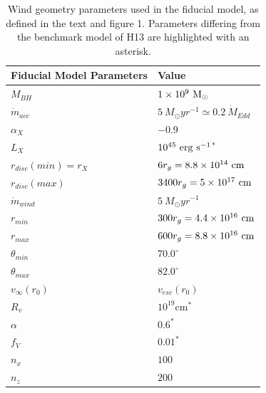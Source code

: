 \documentclass[useAMS,usenatbib]{mn2e_x}
\begin{document}
\begin{table}
\begin{tabular}{p{3cm}p{4cm}}
\hline Fiducial Model Parameters 	&	 Value \\ 
\hline \hline 
$M_{BH}$ 	 &	 $1\times 10^9~\rm{M_{\odot}}$ \\ 
$\dot{m}_{acc}$ 	 &	 $5~M_{\odot}yr^{-1} \simeq 0.2~\dot{M}_{Edd}$\\ 
$\alpha_X$ 	 &	 $-0.9$ \\ 
$L_{X} $ 	 &	 $10^{45}~\rm{erg~s^{-1}}$$^*$ \\ 
$r_{disc}(min)=r_{X}$   &	 $6r_g=8.8\times10^{14}~{\rm cm}$ \\ 
$r_{disc}(max)$   &	 $3400r_g = 5\times10^{17}~{\rm cm}$ \\ 
$\dot{m}_{wind}$  &	 $5~M_{\odot}yr^{-1}$ \\ 
$r_{min}$ 	&	 $300r_{g} = 4.4\times10^{16}~{\rm cm}$\\ 
$r_{max}$ 	&	 $600r_{g} = 8.8\times10^{16}~{\rm cm}$ \\ 
$\theta_{min}$ 	&	 $70.0^{\circ}$ \\ 
$\theta_{max}$ 	&	 $82.0^{\circ}$ \\ 
$v_{\infty}(r_0)$ 	&	 $v_{esc}(r_0)$ \\ 
$R_v$  	        &	 $10^{19}$cm$^*$ \\ 
$\alpha$ 	&	 $0.6^*$ \\
$f_V$ 	&	 $0.01^*$  \\
$n_x$ 	&	 $100$  \\
$n_z$ 	&	 $200$  \\
\hline 
\end{tabular}
\caption{Wind geometry parameters 
used in the fiducial model, as defined in the text and figure 1.
Parameters differing from the benchmark model of H13 are 
highlighted with an asterisk.}
\label{wind_param}
\end{table}
\end{document}
